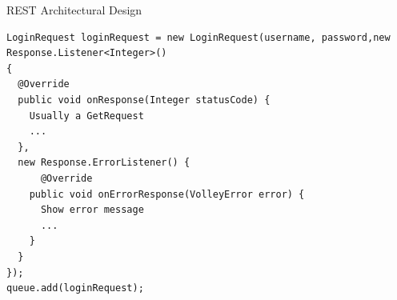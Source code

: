 \begin{frame}[fragile]{REST Architectural Design}
\begin{center}
\begin{minipage}[H]{0.9\linewidth}
\begin{lstlisting}
LoginRequest loginRequest = new LoginRequest(username, password,new Response.Listener<Integer>() 
{
  @Override
  public void onResponse(Integer statusCode) {
    Usually a GetRequest
    ...
  }, 
  new Response.ErrorListener() {
	  @Override
    public void onErrorResponse(VolleyError error) {
      Show error message
      ...
    }
  }
});
queue.add(loginRequest);

\end{lstlisting}
\end{minipage}
\end{center}
\end{frame}

